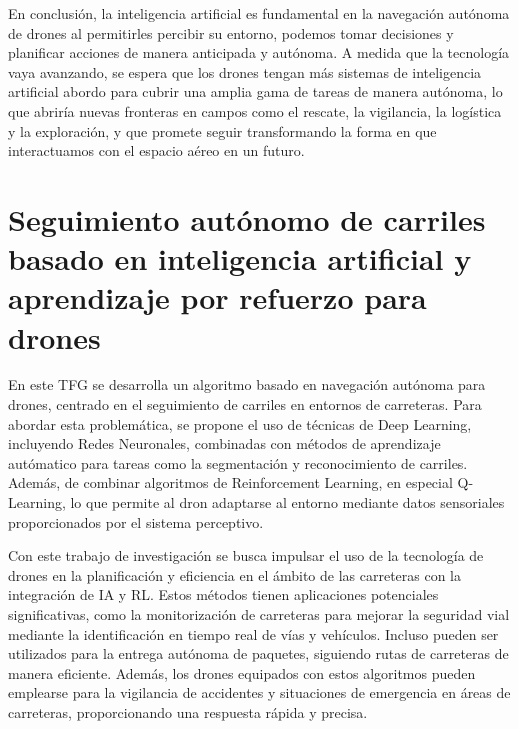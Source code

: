 En conclusión, la inteligencia artificial es fundamental en la navegación autónoma de drones al permitirles percibir su entorno, podemos tomar decisiones y planificar acciones 
de manera anticipada y autónoma. A medida que la tecnología vaya avanzando, se espera que los drones tengan más sistemas de inteligencia artificial abordo para cubrir una amplia gama de tareas
de manera autónoma, lo que abriría nuevas fronteras en campos como el rescate, la vigilancia, la logística y la exploración, y que promete seguir transformando la forma en que 
interactuamos con el espacio aéreo en un futuro. 

\section{Seguimiento autónomo de carriles basado en inteligencia artificial y aprendizaje por refuerzo para drones}
\label{sec:Navegación autónoma}

En este TFG se desarrolla un algoritmo basado en navegación autónoma para drones, centrado en el seguimiento de carriles en entornos de carreteras. Para abordar esta problemática, se propone 
el uso de técnicas de Deep Learning, incluyendo Redes Neuronales, combinadas con métodos de aprendizaje autómatico para tareas como la segmentación y reconocimiento de carriles. Además, 
de combinar algoritmos de Reinforcement Learning, en especial Q-Learning, lo que permite al dron adaptarse al entorno mediante datos sensoriales proporcionados por el sistema perceptivo.

Con este trabajo de investigación se busca impulsar el uso de la tecnología de drones en la planificación y eficiencia en el ámbito de las carreteras con la integración 
de IA y RL. Estos métodos tienen aplicaciones potenciales significativas, como la monitorización de carreteras para mejorar la seguridad vial mediante la identificación en tiempo 
real de vías y vehículos. Incluso pueden ser utilizados para la entrega autónoma de paquetes, siguiendo rutas de carreteras de manera eficiente. Además, los drones equipados 
con estos algoritmos pueden emplearse para la vigilancia de accidentes y situaciones de emergencia en áreas de carreteras, proporcionando una respuesta rápida y precisa.




